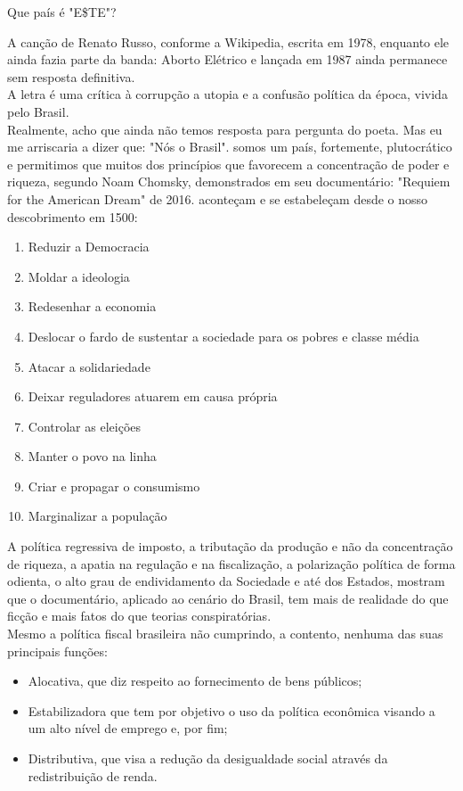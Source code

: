 \documentclass[12pt,a4paper]{article}
\begin{document}
\centerline{Que país é "E\$TE"?}
\noindent
A canção de Renato Russo, conforme a Wikipedia, escrita em 1978, enquanto ele ainda fazia parte da banda: Aborto Elétrico e lançada em 1987 ainda permanece sem resposta definitiva.\\
A letra é uma crítica à corrupção a utopia e a confusão política da época, vivida pelo Brasil.\\
Realmente, acho que ainda não temos resposta para pergunta do poeta. Mas eu me arriscaria a dizer que: "Nós o Brasil". somos um país, fortemente, plutocrático e permitimos que muitos dos princípios que favorecem a concentração de poder e riqueza, segundo Noam Chomsky, demonstrados em seu documentário: "Requiem for the American Dream" de 2016.  aconteçam e se estabeleçam desde o nosso descobrimento em 1500:
\begin{enumerate}
\item Reduzir a Democracia
\item Moldar a ideologia
\item Redesenhar a economia
\item Deslocar o fardo de sustentar a sociedade para os pobres e classe média
\item Atacar a solidariedade
\item Deixar reguladores atuarem em causa própria
\item Controlar as eleições
\item Manter o povo na linha
\item Criar e propagar o consumismo
\item Marginalizar a população
\end{enumerate}
A política regressiva de imposto, a tributação da produção e não da concentração de riqueza, a apatia na regulação e na fiscalização, a polarização política de forma odienta, o alto grau de endividamento da Sociedade e até dos Estados, mostram que o documentário, aplicado ao cenário do Brasil, tem mais de realidade do que ficção e mais fatos do que teorias conspiratórias.\\
Mesmo a política fiscal brasileira não cumprindo, a contento, nenhuma das suas principais funções:
\begin{itemize}
\item Alocativa, que diz respeito ao fornecimento de bens públicos; 
\item Estabilizadora que tem por objetivo o uso da política econômica visando a um alto nível de emprego e, por fim;
\item Distributiva, que visa a redução da desigualdade social através da redistribuição de renda.
\end{itemize}
\end{document}
